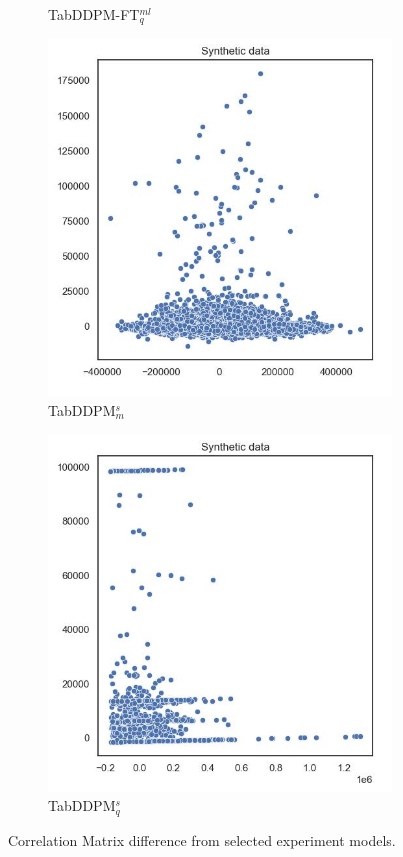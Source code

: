 \begin{figure}[h]
\begin{subfigure}{0.2\textwidth}
		\caption{TabDDPM-FT$^{ml}_q$}
	\end{subfigure}
	\begin{subfigure}{0.2\textwidth}
		\centering
		\includegraphics[width=\textwidth]{images/pca/tab-ddpm-simTune-minmax.jpg}
		\caption{TabDDPM$^{s}_m$}
	\end{subfigure}
	\begin{subfigure}{0.2\textwidth}
		\centering
		\includegraphics[width=\textwidth]{images/pca/tab-ddpm-simTune.jpg}
		\caption{TabDDPM$^{s}_q$}
	\end{subfigure}
	\caption{Correlation Matrix difference from selected experiment models.}
	\label{fig:pca_diffusion}
\end{figure}

